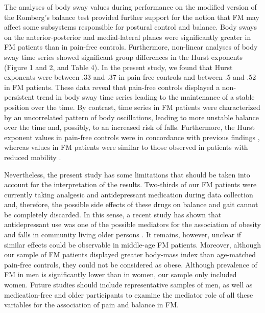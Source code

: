 \documentclass[12pt]{article}
\begin{document}
The analyses of body sway values during performance on the modified version of the Romberg's balance test provided further support for the notion that FM may affect some subsystems responsible for postural control and balance. Body sways on the anterior-posterior and medial-lateral planes were significantly greater in FM patients than in pain-free controls. Furthermore, non-linear analyses of body sway time series showed significant group differences in the Hurst exponents (Figure 1 and 2, and Table 4). In the present study, we found that Hurst exponents were between .33 and .37 in pain-free controls and between .5 and .52 in FM patients. These data reveal that pain-free controls displayed a non-persistent trend in body sway time series leading to the maintenance of a stable position over the time. By contrast, time series in FM patients were characterized by an uncorrelated pattern of body oscillations, leading to more unstable balance over the time and, possibly, to an increased risk of falls. Furthermore, the Hurst exponent values in pain-free controls were in concordance with previous findings \cite{Duarte2000}, whereas values in FM patients were similar to those observed in patients with reduced mobility \cite{Stylianou2011, burgunder1998pathophysiology}.

Nevertheless, the present study has some limitations that should be taken into account for the interpretation of the results. Two-thirds of our FM patients were currently taking analgesic and antidepressant medication during data collection and, therefore, the possible side effects of these drugs on balance and gait cannot be completely discarded. In this sense, a recent study has shown that antidepressant use was one of the possible mediators for the association of obesity and falls in community living older persons \cite{mitchell2015obesity}. It remains, however, unclear if similar effects could be observable in middle-age FM patients. Moreover, although our sample of FM patients displayed greater body-mass index than age-matched pain-free controls, they could not be considered as obese. Although prevalence of FM in men is significantly lower than in women, our sample only included women. Future studies should include representative samples of men, as well as medication-free and older participants to examine the mediator role of all these variables for the association of pain and balance in FM.
\end{document}
